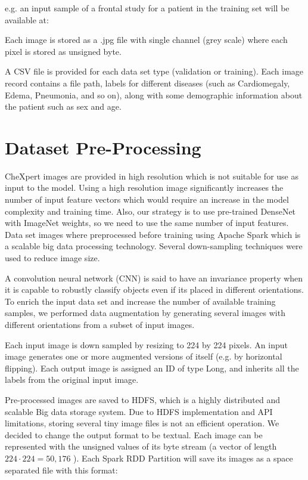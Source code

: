 \documentclass{amia}
\begin{document}
e.g. an input sample of a frontal study for a patient in the training set will be available at:


Each image is stored as a .jpg file with single channel (grey scale) where each pixel is stored as unsigned byte.

A CSV file is provided for each data set type (validation or training). Each image record contains a file path, labels for different diseases (such as Cardiomegaly, Edema, Pneumonia, and so on), along with some demographic information about the patient such as sex and age.


\section*{Dataset Pre-Processing}

CheXpert\cite{ref2} images are provided in high resolution which is not suitable for use as input to the model. Using a high resolution image significantly increases the number of input feature vectors which would require an increase in the model complexity and training time. Also, our strategy is to use pre-trained DenseNet with ImageNet weights, so we need to use the same number of input features. Data set images where preprocessed before training using Apache Spark which is a scalable big data processing technology. Several down-sampling techniques were used to reduce image size.

A convolution neural network (CNN) is said to have an invariance property when it is capable to robustly classify objects even if its placed in different orientations. To enrich the input data set and increase the number of available training samples, we performed data augmentation by generating several images with different orientations from a subset of input images.

Each input image is down sampled by resizing to 224 by 224 pixels. An input image generates one or more augmented versions of itself (e.g. by horizontal flipping). Each output image is assigned an ID of type Long, and inherits all the labels from the original input image.

Pre-processed images are saved to HDFS, which is a highly distributed and scalable Big data storage system. Due to HDFS implementation and API limitations, storing several tiny image files is not an efficient operation.
We decided to change the output format to be textual. Each image can be represented with the unsigned values of its byte stream (a vector of length $224\cdot224=50,176$ ). Each Spark RDD Partition will save its images as a space separated file with this format:
\end{document}
